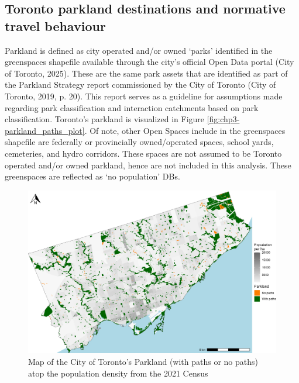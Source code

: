 \documentclass[
11pt, %
oneside, %
english, %
singlespacing, %
]{macthesis} %
\begin{document}
\subsection{Toronto parkland destinations and normative travel behaviour}\label{toronto-parkland-destinations-and-normative-travel-behaviour}

Parkland is defined as city operated and/or owned `parks' identified in the greenspaces shapefile available through the city's official Open Data portal (City of Toronto, 2025). These are the same park assets that are identified as part of the Parkland Strategy report commissioned by the City of Toronto (City of Toronto, 2019, p. 20). This report serves as a guideline for assumptions made regarding park classification and interaction catchments based on park classification. Toronto's parkland is visualized in Figure \ref{fig:chp3-parkland_paths_plot}. Of note, other Open Spaces include in the greenspaces shapefile are federally or provincially owned/operated spaces, school yards, cemeteries, and hydro corridors. These spaces are not assumed to be Toronto operated and/or owned parkland, hence are not included in this analysis. These greenspaces are reflected as `no population' DBs.

\begin{figure}

{\centering \includegraphics[width=6in]{./data/figures/chp3-parkland_paths_plot} 

}

\caption{\label{fig:chp3-parkland_paths_plot}Map of the City of Toronto's Parkland (with paths or no paths) atop the population density from the 2021 Census}\label{fig:unnamed-chunk-46}
\end{figure}
\end{document}
